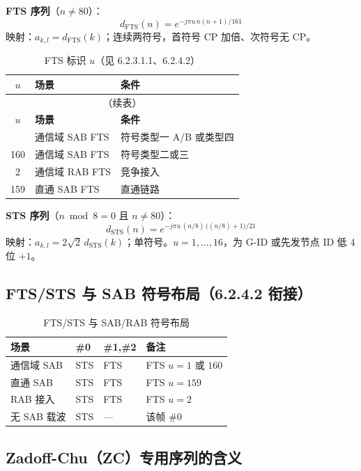 \documentclass[11pt,a4paper]{ctexart}
\begin{document}
\textbf{FTS 序列}（$n{\neq}80$）：
\begin{equation}
d_{\mathrm{FTS}}(n) = e^{-j\pi u\, n (n+1) / 161}
\end{equation}
映射：$a_{k,l} = d_{\mathrm{FTS}}(k)$；连续两符号，首符号 CP 加倍、次符号无 CP。

\begin{longtable}{cll}
\caption{FTS 标识 $u$（见 6.2.3.1.1、6.2.4.2）} \\
\toprule
\textbf{$u$} & \textbf{场景} & \textbf{条件} \\
\midrule
\endfirsthead
\multicolumn{3}{c}{\small（续表）} \\
\toprule
\textbf{$u$} & \textbf{场景} & \textbf{条件} \\
\midrule
\endhead
\bottomrule
\endfoot
1 & 通信域 SAB FTS & 符号类型一 A/B 或类型四 \\
160 & 通信域 SAB FTS & 符号类型二或三 \\
2 & 通信域 RAB FTS & 竞争接入 \\
159 & 直通 SAB FTS & 直通链路 \\
\end{longtable}

\textbf{STS 序列}（$n \bmod 8 = 0$ 且 $n{\neq}80$）：
\begin{equation}
d_{\mathrm{STS}}(n) = e^{-j\pi u\, (n/8)\, \bigl((n/8)+1\bigr) / 21}
\end{equation}
映射：$a_{k,l} = 2\sqrt{2}\, d_{\mathrm{STS}}(k)$；单符号。$u = 1,\ldots,16$，为 G-ID 或先发节点 ID 低 4 位 $+1$。

\subsection{FTS/STS 与 SAB 符号布局（6.2.4.2 衔接）}

\begin{longtable}{llll}
\caption{FTS/STS 与 SAB/RAB 符号布局} \\
\toprule
\textbf{场景} & \textbf{\#0} & \textbf{\#1,\#2} & \textbf{备注} \\
\midrule
通信域 SAB & STS & FTS & FTS $u{=}1$ 或 $160$ \\
直通 SAB & STS & FTS & FTS $u{=}159$ \\
RAB 接入 & STS & FTS & FTS $u{=}2$ \\
无 SAB 载波 & STS & --- & 该帧 \#0 \\
\bottomrule
\end{longtable}

\subsection{Zadoff-Chu（ZC）专用序列的含义}
\end{document}
